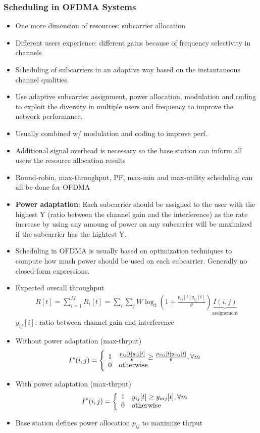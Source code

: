 \subsubsection{Scheduling in OFDMA Systems}
\begin{itemize}
	\item One more dimension of resources: subcarrier allocation
	\item Different users experience: different gains because of frequency selectivity in channels
	\item Scheduling of subcarriers in an adaptive way based on the instantaneous channel qualities.
	\item Use adaptive subcarrier assignment, power allocation, modulation and coding to exploit the diversity in multiple users and frequency to improve the network performance.
	\item Usually combined w/ modulation and coding to improve perf.
	\item Additional signal overhead is necessary so the base station can inform all users the resource allocation results
	\item Round-robin, max-throughput, PF, max-min and max-utility scheduling can all be done for OFDMA
	\item \textbf{Power adaptation}: Each subcarrier should be assigned to the user with the highest Y (ratio between the channel gain and the interference) as the rate increase by using any amoung of power on any subcarrier will be maximized if the subcarrier has the hightest Y.
	\item Scheduling in OFDMA is usually based on optimization techniques to compute how much power should be used on each subcarrier. Generally no closed-form expressions.
	\item Expected overall throughput
	\begin{align*}
		R[t] = \sum_{i=1}^M R_i[t] = \sum_i \sum_j W \log_2 
			\left(
				1 + \frac{p_{ij}[t]y_{ij}[t]}{\theta}
			\right) \underbrace{I(i,j)}_{\text{assignement}}
	\end{align*}
	$y_{ij}[i]$: ratio between channel gain and interference
	\item Without power adaptation (max-thrput)
		\begin{align*}
			I^*(i,j) = 
				\left\{
					\begin{array}{c l}
						1 & \frac{p_{ij}[t]y_{ij}[t]}{\theta} \geq \frac{p_{mj}[t]y_{mj}[t]}{\theta}, \forall m\\
						0 & \text{otherwise}
					\end{array}
				\right.
		\end{align*}
	\item With power adaptation (max-thrput)
		\begin{align*}
			I^*(i,j) = 
				\left\{
					\begin{array}{c l}
						1 & y_{ij}[t] \geq y_{mj}[t], \forall m\\
						0 & \text{otherwise}
					\end{array}
				\right.
		\end{align*}
	\item Base station defines power allocation $p_{ij}$ to maximize thrput
\end{itemize}
